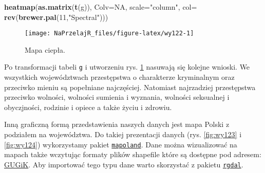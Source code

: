 \documentclass[polish,]{book}
\newenvironment{Shaded}{\begin{snugshade}}{\end{snugshade}}
\newcommand{\DataTypeTok}[1]{\textcolor[rgb]{0.13,0.29,0.53}{#1}}
\newcommand{\DecValTok}[1]{\textcolor[rgb]{0.00,0.00,0.81}{#1}}
\newcommand{\KeywordTok}[1]{\textcolor[rgb]{0.13,0.29,0.53}{\textbf{#1}}}
\newcommand{\NormalTok}[1]{#1}
\newcommand{\OtherTok}[1]{\textcolor[rgb]{0.56,0.35,0.01}{#1}}
\newcommand{\StringTok}[1]{\textcolor[rgb]{0.31,0.60,0.02}{#1}}
\begin{document}
\begin{Shaded}
\begin{Highlighting}[]
\KeywordTok{heatmap}\NormalTok{(}\KeywordTok{as.matrix}\NormalTok{(}\KeywordTok{t}\NormalTok{(g)), }\DataTypeTok{Colv=}\OtherTok{NA}\NormalTok{, }\DataTypeTok{scale=}\StringTok{"column"}\NormalTok{,}
\DataTypeTok{col=} \KeywordTok{rev}\NormalTok{(}\KeywordTok{brewer.pal}\NormalTok{(}\DecValTok{11}\NormalTok{,}\StringTok{"Spectral"}\NormalTok{)))}
\end{Highlighting}
\end{Shaded}

\begin{figure}[h]

{\centering \texttt{[image: NaPrzelajR\_files/figure-latex/wy122-1]} 

}

\caption{Mapa ciepła.}\label{fig:wy122}
\end{figure}

Po transformacji tabeli \texttt{g} i utworzeniu rys. \ref{fig:wy122} nasuwają się kolejne wnioski. We
wszystkich województwach przestępstwa o charakterze kryminalnym oraz przeciwko mieniu są popełniane najczęściej. Natomiast najrzadziej przestępstwa przeciwko
wolności, wolności sumienia i wyznania, wolności seksualnej i obyczjności, rodzinie i opiece a także życiu i zdrowiu.

Inną graficzną formą przedstawienia naszych danych jest mapa Polski z podziałem na województwa. Do takiej prezentacji danych (rys. \ref{fig:wy123} i \ref{fig:wy124}) wykorzystamy pakiet \href{https://rdrr.io/rforge/mapoland/}{\texttt{mapoland}}. Dane można wizualizować na mapach także wczytując formaty plików shapefile które są dostępne pod adresem: \href{http://www.gugik.gov.pl/pzgik/dane-bez-oplat/dane-z-panstwowego-rejestru-granic-i-powierzchni-jednostek-podzialow-terytorialnych-kraju-prg}{GUGiK}. Aby importować tego typu dane warto skorzystać z pakietu \href{https://rdrr.io/cran/rgdal/}{\texttt{rgdal}}.
\end{document}
